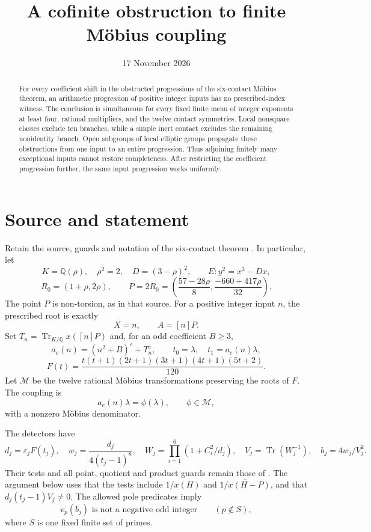\documentclass[11pt,a4paper]{article}
\title{A cofinite obstruction to finite M\"obius coupling}
\author{}\date{17 November 2026}
\newcommand{\Q}{\mathbb Q}\newcommand{\Z}{\mathbb Z}
\DeclareMathOperator{\Tr}{Tr}
\begin{document}
\maketitle
\begin{abstract}
For every coefficient shift in the obstructed progressions of the
six-contact M\"obius theorem, an arithmetic progression of positive
integer inputs has no prescribed-index witness. The conclusion is
simultaneous for every fixed finite menu of integer exponents at
least four, rational multipliers, and the twelve contact symmetries.
Local nonsquare classes exclude ten branches, while a simple inert
contact excludes the remaining nonidentity branch. Open subgroups
of local elliptic groups propagate these obstructions from one input
to an entire progression. Thus adjoining finitely many exceptional
inputs cannot restore completeness. After restricting the coefficient
progression further, the same input progression works uniformly.
\end{abstract}

\section{Source and statement}

Retain the source, guards and notation of the six-contact theorem
\cite{Mobius}. In particular, let
\[
 K=\Q(\rho),\quad \rho^2=2,\quad D=(3-\rho)^2,
 \qquad E:y^2=x^3-Dx,
\]
\[
 R_0=(1+\rho,2\rho),\qquad
 P=2R_0=\left(\frac{57-28\rho}{8},
                       \frac{-660+417\rho}{32}\right).
\]
The point $P$ is non-torsion, as in that source. For a positive
integer input $n$, the prescribed root is exactly
\begin{equation}\label{eq:prescribed}
                 X=n,\qquad A=[n]P.
\end{equation}
Set $T_n=\Tr_{K/\Q}x([n]P)$ and, for an odd coefficient $B\ge3$,
\[
 a_e(n)=(n^2+B)^e+T_n^e,\qquad
 t_0=\lambda,\quad t_1=a_e(n)\lambda,
\]
\[
 F(t)=\frac{t(t+1)(2t+1)(3t+1)(4t+1)(5t+2)}{120}.
\]
Let $\mathcal M$ be the twelve rational M\"obius transformations
preserving the roots of $F$. The coupling is
\begin{equation}\label{eq:coupling}
                  a_e(n)\lambda=\phi(\lambda),
                  \qquad\phi\in\mathcal M,
\end{equation}
with a nonzero M\"obius denominator.

The detectors have
\[
 d_j=\varepsilon_j F(t_j),\quad
 w_j=\frac{d_j}{4(t_j-1)^8},\quad
 W_j=\prod_{i=1}^6(1+C_i^2/d_j),\quad
 V_j=\Tr(W_j^{-1}),\quad b_j=4w_j/V_j^2.
\]
Their tests and all point, quotient and product guards remain those
of \cite{Mobius}. The argument below uses that the tests include
$1/x(H)$ and $\overline{1/x(H-P)}$, and that
$d_j(t_j-1)V_j\ne0$. The allowed pole predicates imply
\begin{equation}\label{eq:pole}
 v_p(b_j)\text{ is not a negative odd integer}
                         \qquad(p\notin S),
\end{equation}
where $S$ is one fixed finite set of primes.
\end{document}
